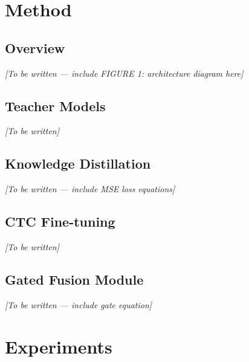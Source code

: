 \documentclass{article} %
\begin{document}
\section{Method}
\label{sec:method}

\subsection{Overview}
\textit{[To be written --- include FIGURE 1: architecture diagram here]}

\subsection{Teacher Models}
\textit{[To be written]}

\subsection{Knowledge Distillation}
\textit{[To be written --- include MSE loss equations]}

\subsection{CTC Fine-tuning}
\textit{[To be written]}

\subsection{Gated Fusion Module}
\textit{[To be written --- include gate equation]}

\section{Experiments}
\label{sec:experiments}
\end{document}
